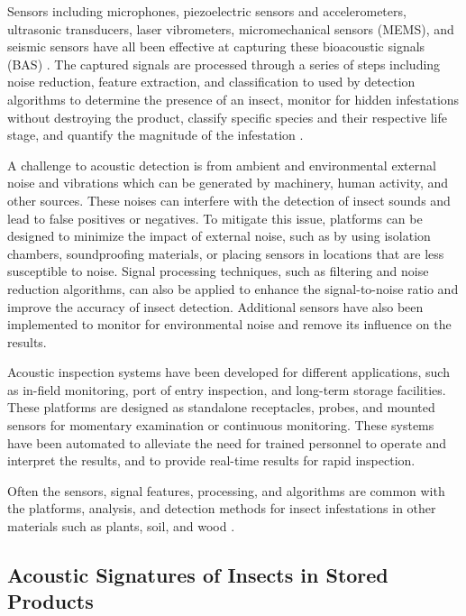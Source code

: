 \documentclass[../Vibro-Acoustic Signatures and Detection Algorithms for Stored Product Insects.tex]{subfiles}
\begin{document}
Sensors including microphones, piezoelectric sensors and accelerometers, ultrasonic transducers, laser vibrometers, micromechanical sensors (MEMS), and seismic sensors have all been effective at capturing these bioacoustic signals (BAS) \cite{changBioacousticDetectionFour2025}. The captured signals are processed through a series of steps including noise reduction, feature extraction, and classification to used by detection algorithms to determine the presence of an insect, monitor for hidden infestations without destroying the product, classify specific species and their respective life stage, and quantify the magnitude of the infestation \cite{mankinAutomatedApplicationsAcoustics2021}.

A challenge to acoustic detection is from ambient and environmental external noise and vibrations which can be generated by machinery, human activity, and other sources. These noises can interfere with the detection of insect sounds and lead to false positives or negatives. To mitigate this issue, platforms can be designed to minimize the impact of external noise, such as by using isolation chambers, soundproofing materials, or placing sensors in locations that are less susceptible to noise. Signal processing techniques, such as filtering and noise reduction algorithms, can also be applied to enhance the signal-to-noise ratio and improve the accuracy of insect detection. Additional sensors have also been implemented to monitor for environmental noise and remove its influence on the results.

Acoustic inspection systems have been developed for different applications, such as in-field monitoring, port of entry inspection, and long-term storage facilities. These platforms are designed as standalone receptacles, probes, and mounted sensors for momentary examination or continuous monitoring. These systems have been automated to alleviate the need for trained personnel to operate and interpret the results, and to provide real-time results for rapid inspection.

Often the sensors, signal features, processing, and algorithms are common with the platforms, analysis, and detection methods for insect infestations in other materials such as plants, soil, and wood \cite{sutinAutomatedAcousticDetection2019}.

\newpage
\subsection{Acoustic Signatures of Insects in Stored Products}
\end{document}
